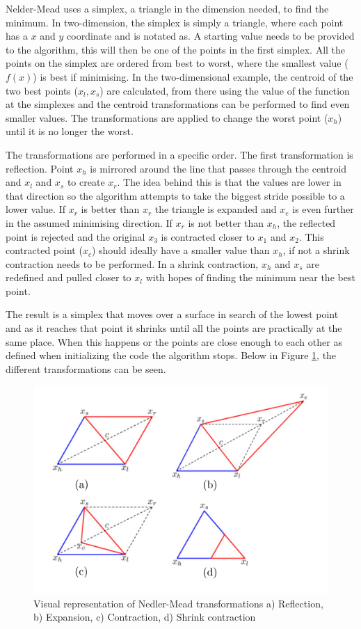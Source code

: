 Nelder-Mead uses a simplex, a triangle in the dimension needed, to find the minimum.
In two-dimension, the simplex is simply a triangle, where each point has a $x$ and $y$ coordinate and is notated as. 
A starting value needs to be provided to the algorithm, this will then be one of the points in the first simplex.
All the points on the simplex are ordered from best to worst, where the smallest value  ($f (x)$) is best if minimising.
In the two-dimensional example, the centroid of the two best points  ($x_l,x_s$) are calculated, from there using the value of the function at the simplexes and the centroid transformations can be performed to find even smaller values.
The transformations are applied to change the worst point  ($x_h$) until it is no longer the worst.

The transformations are performed in a specific order.
The first transformation is reflection.
Point $x_h$ is mirrored around the line that passes through the centroid and $x_l$ and $x_s$ to create $x_r$.
The idea behind this is that the values are lower in that direction so the algorithm attempts to take the biggest stride possible to a lower value.
If $x_r$ is better than $x_r$  the triangle is expanded and $x_e$ is even further in the assumed minimising direction.
If $x_r$ is not better than $x_h$, the reflected point is rejected and the original $x_3$ is contracted closer to $x_1$ and $x_2$.
This contracted point ($x_c$) should ideally have a smaller value than $x_h$, if not a shrink contraction needs to be performed.
In a shrink contraction, $x_h$ and $x_s$ are redefined and pulled closer to $x_l$ with hopes of finding the minimum near the best point.

The result is a simplex that moves over a surface in search of the lowest point and as it reaches that point it shrinks until all the points are practically at the same place. When this happens or the points are close enough to each other as defined when initializing the code the algorithm stops. Below in Figure \ref{neldermeadfig}, the different transformations can be seen.

\begin{figure}
\centering
\includegraphics[width=\linewidth]{figures/MAP_expl.png}
\caption{Visual representation of Nedler-Mead transformations a) Reflection, b) Expansion, c) Contraction, d) Shrink contraction \citep{sachin:2016}}
\label{neldermeadfig}
\end{figure}



